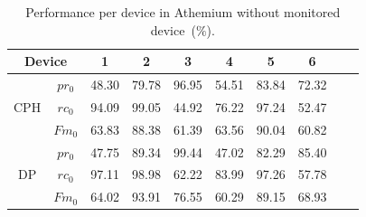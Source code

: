 \begin{table}
\caption{Performance per device in Athemium without monitored device~($\%$).}\label{table:SR6d}
\begin{center}
\begin{tabular}{|c|c|c|c|c|c|c|c|c|c|}
\hline
\multicolumn{2}{|c|}{Device}& 1&2&3&4&5&6\\
\hline
\multirow{3}{*}{CPH} & $pr_0$&48.30&79.78&96.95&54.51&83.84&72.32  \\
& $rc_0$&94.09&99.05&44.92&76.22&97.24&52.47   \\
& $Fm_0$ &63.83&88.38&61.39&63.56&90.04&60.82\\
\hline
\multirow{3}{*}{DP} & $pr_0$ &47.75 &89.34 &99.44 &47.02 &82.29 &85.40  \\
& $rc_0$ &97.11 &98.98 &62.22 &83.99 &97.26 &57.78   \\
& $Fm_0$ &64.02 &93.91 &76.55 &60.29 &89.15 &68.93  \\
\hline
\end{tabular}
\end{center}
\end{table}

